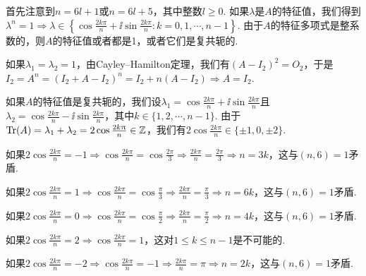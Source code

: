\begin{solution}
  首先注意到$n=6l+1$或$n=6l+5$，其中整数$l\ge0$. 如果$\lambda$是$A$的特征值，我们得到$\lambda^n=1\Rightarrow \lambda\in\left\{ \cos\frac{2k\pi}n+\ii\sin\frac{2k\pi}n:
  k=0,1,\cdots,n-1\right\}$. 由于$A$的特征多项式是整系数的，则$A$的特征值或者都是1，或者它们是复共轭的.

  如果$\lambda_1=\lambda_2=1$，由Cayley--Hamilton定理，我们有$(A-I_2)^2=O_2$，于是$I_2=A^n=(I_2+A-I_2)^n=I_2+n(A-I_2)\Rightarrow A=I_2$.

  如果$A$的特征值是复共轭的，我们设$\lambda_1=\cos\frac{2k\pi}n+\ii\sin\frac{2k\pi}n$且
  $\lambda_2=\cos\frac{2k\pi}n-\ii\sin\frac{2k\pi}n$，其中$k\in\{1,2,\cdots,n-1\}$. 由于$\operatorname{Tr}(A)=\lambda_1+\lambda_2=2\cos\frac{2k\uppi}n\in\mathbb Z$，我们有$2\cos\frac{2k\pi}n\in\{\pm1,0,\pm2\}$.

  如果$2\cos\frac{2k\pi}n=-1\Rightarrow\cos\frac{2k\pi}n=\cos
  \frac{2\pi}3\Rightarrow\frac{2k\pi}n=\frac{2\pi}3
  \Rightarrow n=3k$，这与$(n,6)=1$矛盾.

  如果$2\cos\frac{2k\pi}n=1\Rightarrow\cos\frac{2k\pi}n=\cos
  \frac{\pi}3\Rightarrow\frac{2k\pi}n=\frac{\pi}3
  \Rightarrow n=6k$，这与$(n,6)=1$矛盾.

  如果$2\cos\frac{2k\pi}n=0\Rightarrow\cos\frac{2k\pi}n=\cos
  \frac{\pi}2\Rightarrow\frac{2k\pi}n=\frac{\pi}2
  \Rightarrow n=4k$，这与$(n,6)=1$矛盾.

  如果$2\cos\frac{2k\pi}n=2\Rightarrow\cos\frac{2k\pi}n=1$，这对$1\le k\le n-1$是不可能的.

  如果$2\cos\frac{2k\pi}n=-2\Rightarrow\cos\frac{2k\pi}n=-1
  \Rightarrow\frac{2k\pi}n=\pi  \Rightarrow n=2k$，这与$(n,6)=1$矛盾.
\end{solution}


